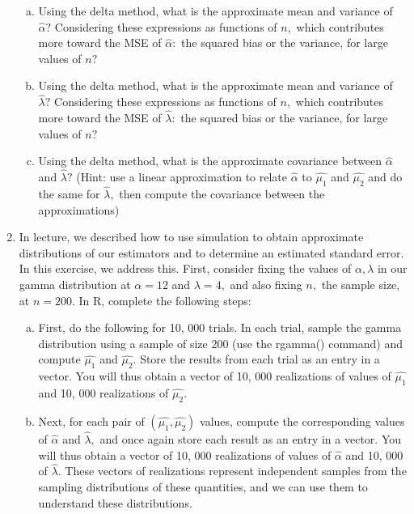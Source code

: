 \documentclass{article}
\begin{document}
\begin{enumerate}
\begin{enumerate}[(a)]
			\item Using the delta method, what is the approximate mean and variance of $\hat{\alpha}?$ Considering these expressions as functions of $n,$ which contributes more toward the MSE of $\hat{\alpha}:$ the squared bias or the variance, for large values of $n?$

			\item Using the delta method, what is the approximate mean and variance of $\hat{\lambda}?$ Considering these expressions as functions of $n,$ which contributes more toward the MSE of $\hat{\lambda}:$ the squared bias or the variance, for large values of $n?$

			\item Using the delta method, what is the approximate covariance between $\hat{\alpha}$ and $\hat{\lambda}?$ (Hint: use a linear approximation to relate $\hat{\alpha}$ to $\hat{\mu_1}$ and $\hat{\mu_2}$ and do the same for $\hat{\lambda},$ then compute the covariance between the approximations)

		\end{enumerate}

	\item In lecture, we described how to use simulation to obtain approximate distributions of our estimators and to determine an estimated standard error. In this exercise, we address this. First, consider fixing the values of $\alpha, \lambda$ in our gamma distribution at $\alpha=12$ and $\lambda=4,$ and also fixing $n,$ the sample size, at $n=200.$ In R, complete the following steps:
		\begin{enumerate}[a)]
			\item First, do the following for 10, 000 trials. In each trial, sample the gamma distribution using a sample of size 200 (use the rgamma() command) and compute $\hat{\mu_1}$ and $\hat{\mu_2}.$ Store the results from each trial as an entry in a vector. You will thus obtain a vector of 10, 000 realizations of values of $\hat{\mu_1}$ and 10, 000 realizations of $\hat{\mu_2}.$

			\item Next, for each pair of $(\hat{\mu_1}, \hat{\mu_2})$ values, compute the corresponding values of $\hat{\alpha}$ and $\hat{\lambda},$ and once again store each result as an entry in a vector. You will thus obtain a vector of 10, 000 realizations of values of $\hat{\alpha}$ and 10, 000 of $\hat{\lambda}.$ These vectors of realizations represent independent samples from the sampling distributions of these quantities, and we can use them to understand these distributions.


\end{enumerate}
\end{enumerate}
\end{document}

